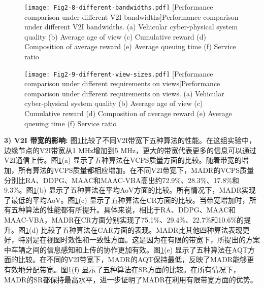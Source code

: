 \begin{figure}[h]
  \centering
  \texttt{[image: Fig2-8-different-bandwidths.pdf]}
  [Performance comparison under different V2I bandwidths]{Performance comparison under different V2I bandwidths. (a) Vehicular cyber-physical system quality (b) Average age of view (c) Cumulative reward (d) Composition of average reward (e) Average queuing time (f) Service ratio}
  \label{fig 2-8}
\end{figure}

\begin{figure}[h]
  \centering
  \texttt{[image: Fig2-9-different-view-sizes.pdf]}
  [Performance comparison under different requirements on views]{Performance comparison under different requirements on views. (a) Vehicular cyber-physical system quality (b) Average age of view (c) Cumulative reward (d) Composition of average reward (e) Average queuing time (f) Service ratio}
  \label{fig 2-9}
\end{figure}

\textbf{3) V2I 带宽的影响:}
图\ref{fig 2-8}比较了不同V2I带宽下五种算法的性能。在这组实验中，边缘节点的V2I带宽从1 MHz增加到5 MHz，更大的带宽代表更多的信息可以通过V2I通信上传。图\ref{fig 2-8}(a) 显示了五种算法在VCPS质量方面的比较。随着带宽的增加，所有算法的VCPS质量都相应增加。在不同V2I带宽下，MADR的VCPS质量分别比RA、DDPG、MAAC和MAAC-VBA高出约72.9\%、28.3\%、17.8\%和9.3\%。图\ref{fig 2-8}(b) 显示了五种算法在平均AoV方面的比较。所有情况下，MADR实现了最低的平均AoV。图\ref{fig 2-8}(c) 显示了五种算法在CR方面的比较。当带宽增加时，所有五种算法的性能都有所提升。具体来说，相比于RA、DDPG、MAAC和MAAC-VBA，MADR在CR方面分别实现了75.1\%、29.4\%、22.7\%和10.6\%的提升。图\ref{fig 2-8}(d) 比较了五种算法在CAR方面的表现。MADR比其他四种算法表现更好，特别是在视图时效性和一致性方面。这是因为在有限的带宽下，所提出的方案中车辆之间的信息感知和上传的协作更加有效。图\ref{fig 2-8}(e) 显示了五种算法在AQT方面的比较。在不同的V2I带宽下，MADR的AQT保持最低，反映了MADR能够更有效地分配带宽。图\ref{fig 2-8}(f) 显示了五种算法在SR方面的比较。在所有情况下，MADR的SR都保持最高水平，进一步证明了MADR在利用有限带宽方面的优势。

